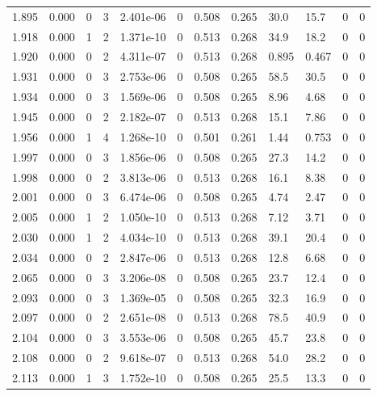 \documentclass[preview]{standalone}
\begin{document}
{{{{{\begin{tabular}{L{1.2cm}C{1.2cm} C{0.3cm}C{0.5cm} C{1.4cm}C{1.4cm} C{1.4cm}C{1.4cm} C{1.6cm}C{1.6cm} C{1.6cm}C{1.6cm}}
  1.895  &  0.000  & 0     &  3 &  2.401e-06  & 0  &  0.508&   0.265& 30.0 & 15.7   &  0 & 0  \\ 
  1.918  &  0.000  & 1     &  2 &  1.371e-10  & 0  &  0.513&   0.268& 34.9 & 18.2   &  0 & 0  \\ 
  1.920  &  0.000  & 0     &  2 &  4.311e-07  & 0  &  0.513&   0.268& 0.895 & 0.467   &  0 & 0  \\ 
  1.931  &  0.000  & 0     &  3 &  2.753e-06  & 0  &  0.508&   0.265& 58.5 & 30.5   &  0 & 0  \\ 
  1.934  &  0.000  & 0     &  3 &  1.569e-06  & 0  &  0.508&   0.265& 8.96 & 4.68   &  0 & 0  \\ 
  1.945  &  0.000  & 0     &  2 &  2.182e-07  & 0  &  0.513&   0.268& 15.1 & 7.86   &  0 & 0  \\ 
  1.956  &  0.000  & 1     &  4 &  1.268e-10  & 0  &  0.501&   0.261& 1.44 & 0.753   &  0 & 0  \\ 
  1.997  &  0.000  & 0     &  3 &  1.856e-06  & 0  &  0.508&   0.265& 27.3 & 14.2   &  0 & 0  \\ 
  1.998  &  0.000  & 0     &  2 &  3.813e-06  & 0  &  0.513&   0.268& 16.1 & 8.38   &  0 & 0  \\ 
  2.001  &  0.000  & 0     &  3 &  6.474e-06  & 0  &  0.508&   0.265& 4.74 & 2.47   &  0 & 0  \\ 
  2.005  &  0.000  & 1     &  2 &  1.050e-10  & 0  &  0.513&   0.268& 7.12 & 3.71   &  0 & 0  \\ 
  2.030  &  0.000  & 1     &  2 &  4.034e-10  & 0  &  0.513&   0.268& 39.1 & 20.4   &  0 & 0  \\ 
  2.034  &  0.000  & 0     &  2 &  2.847e-06  & 0  &  0.513&   0.268& 12.8 & 6.68   &  0 & 0  \\ 
  2.065  &  0.000  & 0     &  3 &  3.206e-08  & 0  &  0.508&   0.265& 23.7 & 12.4   &  0 & 0  \\ 
  2.093  &  0.000  & 0     &  3 &  1.369e-05  & 0  &  0.508&   0.265& 32.3 & 16.9   &  0 & 0  \\ 
  2.097  &  0.000  & 0     &  2 &  2.651e-08  & 0  &  0.513&   0.268& 78.5 & 40.9   &  0 & 0  \\ 
  2.104  &  0.000  & 0     &  3 &  3.553e-06  & 0  &  0.508&   0.265& 45.7 & 23.8   &  0 & 0  \\ 
  2.108  &  0.000  & 0     &  2 &  9.618e-07  & 0  &  0.513&   0.268& 54.0 & 28.2   &  0 & 0  \\ 
  2.113  &  0.000  & 1     &  3 &  1.752e-10  & 0  &  0.508&   0.265& 25.5 & 13.3   &  0 & 0  \\ 

\end{tabular}}}}}}
\end{document}
